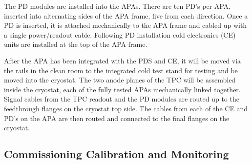 The PD modules are installed into the APAs. There are ten PD's per APA, inserted into alternating sides of the APA frame, five from each direction. Once a PD is inserted, it is attached mechanically to the APA frame  and cabled up with a single power/readout cable. Following PD installation cold electronics (CE) units are installed at the top of the APA frame.

After the APA has been integrated with the PDS and CE, it will be moved via the rails in the clean room to the integrated cold test stand for testing and be moved into the cryostat. The two anode planes of the TPC will be assembled inside the cryostat, each of the fully tested APAs mechanically linked together. Signal cables from the TPC readout and the PD modules are routed up to the feedthrough flanges on the cryostat top side. The cables from each of the CE and PD's on the APA are then routed and connected to the final flanges on the cryostat.


\subsection{Commissioning Calibration and Monitoring}
\label{sec:fdsp-pd-install-calib}



